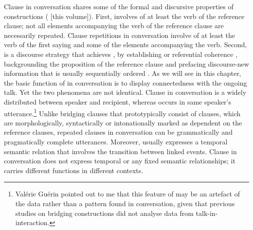\documentclass[output=paper]{LSP/langsci}
\begin{document}
Clause  in  conversation shares some of the formal and discursive properties of  constructions (\citealt[cf.][]{chapters/01Guerin-Aiton} [this volume]). First,  involves  of at least the verb of the reference clause; not all elements accompanying the verb of the reference clause are necessarily repeated. Clause repetitions in  conversation involve  of at least the verb of the first saying and some of the elements accompanying the verb. Second,  is a discourse strategy that achieves , by establishing  or referential coherence \citep{devries.2005}, backgrounding the proposition of the reference clause and prefacing discourse-new information that is usually sequentially ordered . As we will see in this chapter, the basic function of  in  conversation is to display connectedness with the ongoing talk. Yet the two phenomena are not identical. Clause  in  conversation is a  widely distributed between speaker and recipient, whereas  occurs in same speaker’s utterance.\footnote{Valérie Guérin pointed out to me that this feature of  may be an artefact of the data rather than a pattern found in conversation, given that previous studies on bridging constructions did not analyse data from talk-in-interaction.} Unlike bridging clauses that prototypically consist of clauses, which are morphologically, syntactically or intonationally marked as dependent on the reference clauses, repeated clauses in  conversation can be grammatically and pragmatically complete utterances. Moreover,  usually expresses a temporal semantic relation that involves the transition between linked events. Clause  in  conversation does not express temporal  or any fixed semantic relationships; it carries different functions in different contexts.  
\end{document}
